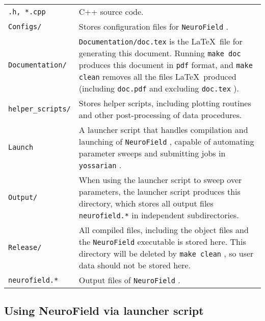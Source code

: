 \documentclass[12pt,a4paper]{article}
\newcommand{\type}[1]{ {\small\small\tt #1} }
\begin{document}
\begin{tabular}{l p{12cm}}
\type{*.h, *.cpp}& C++ source code.\\
\type{Configs/}& Stores configuration files for \type{NeuroField}.\\
\type{Documentation/}& \type{Documentation/doc.tex} is the \LaTeX\ file for generating this document. Running \type{make doc} produces this document in \type{pdf} format, and \type{make clean} removes all the files \LaTeX\ produced (including \type{doc.pdf} and excluding \type{doc.tex}).\\
\type{helper\_scripts/}& Stores helper scripts, including plotting routines and other post-processing of data procedures.\\
\type{Launch}& A launcher script that handles compilation and launching of \type{NeuroField}, capable of automating parameter sweeps and submitting jobs in \type{yossarian}.\\
\type{Output/}& When using the launcher script to sweep over parameters, the launcher script produces this directory, which stores all output files \type{neurofield.*} in independent subdirectories.\\
\type{Release/}& All compiled files, including the object files and the \type{NeuroField} executable is stored here. This directory will be deleted by \type{make clean}, so user data should not be stored here.\\
\type{neurofield.*}& Output files of \type{NeuroField}.
\end{tabular}

\subsection{Using NeuroField via launcher script}
\end{document}
